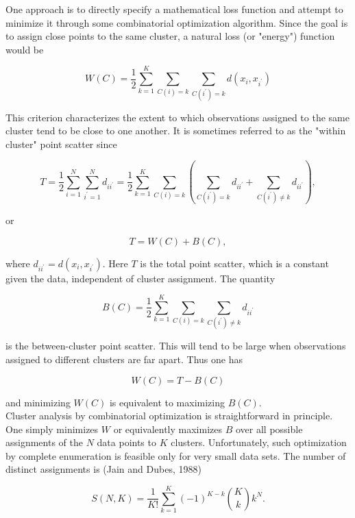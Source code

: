 \documentclass[10pt]{article}
\begin{document}
One approach is to directly specify a mathematical loss function and attempt to minimize it through some combinatorial optimization algorithm. Since the goal is to assign close points to the same cluster, a natural loss (or "energy") function would be


\begin{equation*}
W(C)=\frac{1}{2} \sum_{k=1}^{K} \sum_{C(i)=k} \sum_{C\left(i^{\prime}\right)=k} d\left(x_{i}, x_{i^{\prime}}\right) \tag{14.28}
\end{equation*}


This criterion characterizes the extent to which observations assigned to the same cluster tend to be close to one another. It is sometimes referred to as the "within cluster" point scatter since

$$
T=\frac{1}{2} \sum_{i=1}^{N} \sum_{i^{\prime}=1}^{N} d_{i i^{\prime}}=\frac{1}{2} \sum_{k=1}^{K} \sum_{C(i)=k}\left(\sum_{C\left(i^{\prime}\right)=k} d_{i i^{\prime}}+\sum_{C\left(i^{\prime}\right) \neq k} d_{i i^{\prime}}\right),
$$

or

$$
T=W(C)+B(C),
$$

where $d_{i i^{\prime}}=d\left(x_{i}, x_{i^{\prime}}\right)$. Here $T$ is the total point scatter, which is a constant given the data, independent of cluster assignment. The quantity


\begin{equation*}
B(C)=\frac{1}{2} \sum_{k=1}^{K} \sum_{C(i)=k} \sum_{C\left(i^{\prime}\right) \neq k} d_{i i^{\prime}} \tag{14.29}
\end{equation*}


is the between-cluster point scatter. This will tend to be large when observations assigned to different clusters are far apart. Thus one has

$$
W(C)=T-B(C)
$$

and minimizing $W(C)$ is equivalent to maximizing $B(C)$.\\
Cluster analysis by combinatorial optimization is straightforward in principle. One simply minimizes $W$ or equivalently maximizes $B$ over all possible assignments of the $N$ data points to $K$ clusters. Unfortunately, such optimization by complete enumeration is feasible only for very small data sets. The number of distinct assignments is (Jain and Dubes, 1988)


\begin{equation*}
S(N, K)=\frac{1}{K!} \sum_{k=1}^{K}(-1)^{K-k}\binom{K}{k} k^{N} . \tag{14.30}
\end{equation*}
\end{document}
